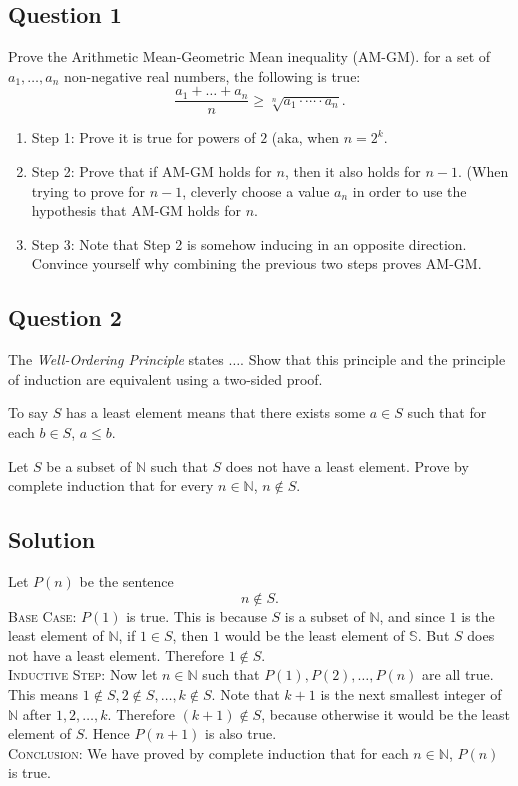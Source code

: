 \documentclass{article}
\begin{document}
\subsection*{Question 1}
    Prove the Arithmetic Mean-Geometric Mean inequality (AM-GM). for a set of $a_{1}, \dots, a_{n}$ non-negative real numbers, the following is true: $$\frac{a_{1} + \dots + a_{n}}{n} \ge \sqrt[n]{a_{1} \cdot \cdots \cdot a_{n}}.$$
    \begin{enumerate}[label = {}]
        \item Step 1: Prove it is true for powers of $2$ (aka, when $n = 2^{k}$.
        \item Step 2: Prove that if AM-GM holds for $n$, then it also holds for $n - 1$. (When trying to prove for $n - 1$, cleverly choose a value $a_{n}$ in order to use the hypothesis that AM-GM holds for $n$.
        \item Step 3: Note that Step 2 is somehow inducing in an opposite direction. Convince yourself why combining the previous two steps proves AM-GM.
    \end{enumerate}


\subsection*{Question 2}
    The \textit{Well-Ordering Principle} states $\ldots$. Show that this principle and the principle of induction are equivalent using a two-sided proof.
    
    
    To say $S$ has a least element means that there exists some $a \in S$ such that for each $b \in S$, $a \le b$.
    
    Let $S$ be a subset of $\mathbb{N}$ such that $S$ does not have a least element. Prove by complete induction that for every $n \in \mathbb{N}$, $n \notin S$.

\subsection*{Solution}
    Let $P(n)$ be the sentence $$n \notin S.$$
    \textsc{Base Case}: $P(1)$ is true. This is because $S$ is a subset of $\mathbb{N}$, and since $1$ is the least element of $\mathbb{N}$, if $1 \in S$, then $1$ would be the least element of $\mathbb{S}$. But $S$ does not have a least element. Therefore $1 \notin S$. \\
    \textsc{Inductive Step}: Now let $n \in \mathbb{N}$ such that $P(1), P(2), \dots, P(n)$ are all true. This means $1 \notin S, 2 \notin S, \dots, k \notin S$. Note that $k + 1$ is the next smallest integer of $\mathbb{N}$ after $1, 2, \dots, k$. Therefore $(k + 1) \notin S$, because otherwise it would be the least element of $S$. Hence $P(n + 1)$ is also true. \\
    \textsc{Conclusion}: We have proved by complete induction that for each $n \in \mathbb{N}$, $P(n)$ is true.
\end{document}
